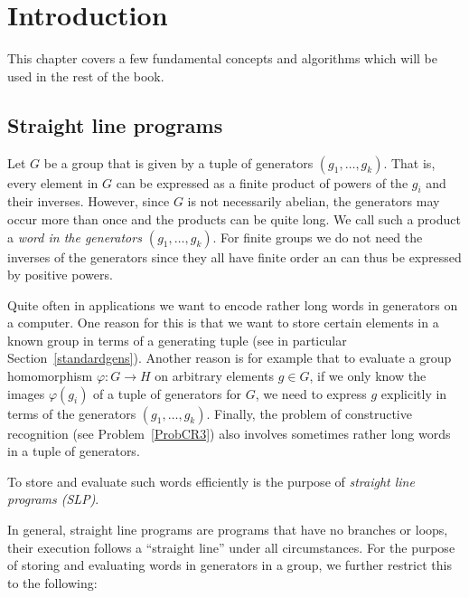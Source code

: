 
\chapter{Introduction}

This chapter covers a few fundamental concepts and algorithms which
will be used in the rest of the book. 

\section{Straight line programs}
\label{slp}

Let $G$ be a group that is given by a tuple of generators $(g_1,
\ldots, g_k)$. That is, every element in $G$ can be expressed as a
finite product of powers of the $g_i$ and their inverses. However,
since $G$ is not necessarily abelian, the generators may occur more
than once and the products can be quite long. We call such a product a 
\emph{word in the generators $(g_1, \ldots, g_k)$}. 
For finite groups we do not need the
inverses of the generators since they all have finite order an can
thus be expressed by positive powers.

Quite often in applications we want to encode rather long words in
generators on a computer. One reason for this is that we want to store certain
elements in a known group in terms of a generating tuple (see in
particular Section~\ref{standardgens}). Another reason is for example that to
evaluate a group homomorphism $\varphi:G \to H$ on arbitrary elements
$g \in G$, if we only know the images $\varphi(g_i)$ of a tuple of
generators for $G$, we need to express $g$ explicitly in terms of
the generators $(g_1, \ldots, g_k)$. Finally, the problem of constructive
recognition (see Problem~\ref{ProbCR3}) also involves sometimes rather
long words in a tuple of generators.

To store and evaluate such words efficiently is the purpose of
\emph{straight line programs (SLP)}.

In general, straight line programs are programs that have no branches
or loops, their execution follows a ``straight line'' under all
circumstances. For the purpose of storing and evaluating words in
generators in a group, we further restrict this to the following:

